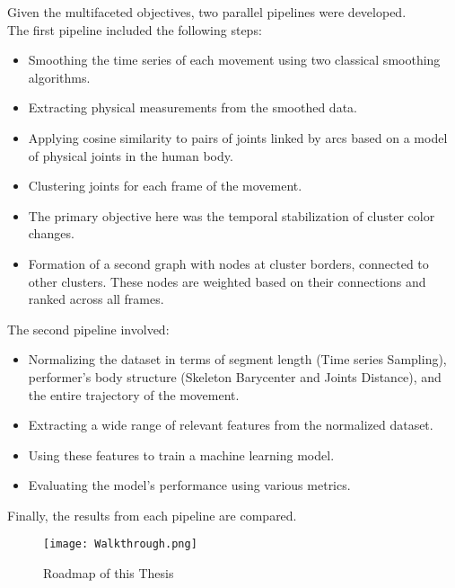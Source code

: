Given the multifaceted objectives, two parallel pipelines were developed.\\
The first pipeline included the following steps:
\begin{itemize}
    \item Smoothing the time series of each movement using two classical smoothing algorithms.
    \item Extracting physical measurements from the smoothed data.
    \item Applying cosine similarity to pairs of joints linked by arcs based on a model of physical joints in the human body.
    \item Clustering joints for each frame of the movement.
    \item The primary objective here was the temporal stabilization of cluster color changes.
    \item Formation of a second graph with nodes at cluster borders, connected to other clusters. These nodes are weighted based on their connections and ranked across all frames.
\end{itemize}
The second pipeline involved:
\begin{itemize}
    \item Normalizing the dataset in terms of segment length (Time series Sampling), performer's body structure (Skeleton Barycenter and Joints Distance), and the entire trajectory of the movement.
    \item Extracting a wide range of relevant features from the normalized dataset.
    \item Using these features to train a machine learning model.
    \item Evaluating the model's performance using various metrics.
\end{itemize}
Finally, the results from each pipeline are compared.

\clearpage
\begin{figure}[H]
    \centering
    \texttt{[image: Walkthrough.png]}
    \caption{Roadmap of this Thesis}
    \label{fig:walktrough}
\end{figure}